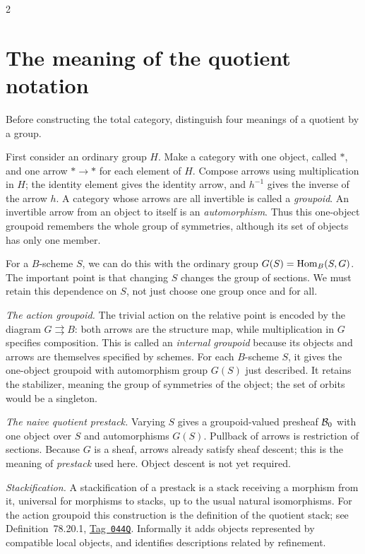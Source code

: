 \documentclass[12pt]{memoir}
\newcommand{\BGtag}[1]{\href{https://stacks.math.columbia.edu/tag/#1}{Tag~\texttt{#1}}}
\begin{document}
\begin{multicols}{2}
\section{The meaning of the quotient notation}\label{sec:quotient}

Before constructing the total category, distinguish four meanings of a
quotient by a group.

First consider an ordinary group $H$. Make a category with one object,
called $*$, and one arrow $*\to *$ for each element of $H$. Compose
arrows using multiplication in $H$; the identity element gives the
identity arrow, and $h^{-1}$ gives the inverse of the arrow $h$.
A category whose arrows are all invertible is called a \emph{groupoid}.
An invertible arrow from an object to itself is an \emph{automorphism}.
Thus this one-object groupoid remembers the whole group of symmetries,
although its set of objects has only one member.

For a $B$-scheme $S$, we can do this with the ordinary group
$G(S)=\operatorname{Hom}_B(S,G)$. The important point is that changing $S$ changes
the group of sections. We must retain this dependence on $S$, not just
choose one group once and for all.

\emph{The action groupoid.} The trivial action on the relative point is
encoded by the diagram $G\rightrightarrows B$: both arrows are the
structure map, while multiplication in $G$ specifies composition.
This is called an \emph{internal groupoid} because its objects and
arrows are themselves specified by schemes. For each $B$-scheme $S$,
it gives the one-object groupoid with automorphism group $G(S)$ just
described.
It retains the stabilizer, meaning the group of symmetries of the
object; the set of orbits would be a singleton.

\emph{The naive quotient prestack.} Varying $S$ gives a groupoid-valued
presheaf $\mathcal{B}_0$ with one object over $S$ and automorphisms $G(S)$.
Pullback of arrows is restriction of sections. Because $G$ is a sheaf,
arrows already satisfy sheaf descent; this is the meaning of
\emph{prestack} used here. Object descent is not yet required.

\emph{Stackification.} A stackification of a prestack is a stack
receiving a morphism from it, universal for morphisms to stacks, up to
the usual natural isomorphisms. For the action groupoid this construction
is the definition of the quotient stack; see Definition~78.20.1,
\BGtag{044Q}. Informally it adds objects represented by compatible local
objects, and identifies descriptions related by refinement.


\end{multicols}
\end{document}
